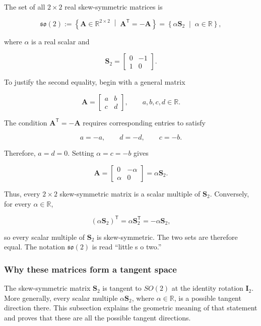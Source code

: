 \documentclass[
  australian,
  12pt,
  letterpaper,
  DIV=11,
  numbers=noendperiod,
  twoside]{scrreprt}
\begin{document}
The set of all \(2\times2\) real skew-symmetric matrices is

\[
\mathfrak{so}(2)
\mathrel{:=}
\left\{
\mathbf A\in\mathbb R^{2\times2}
\;\middle|\;
\mathbf A^\mathsf T=-\mathbf A
\right\}
=
\left\{
\alpha\mathbf S_2
\;\middle|\;
\alpha\in\mathbb R
\right\},
\]

where \(\alpha\) is a real scalar and

\[
\mathbf S_2
=
\begin{bmatrix}
0&-1\\
1&0
\end{bmatrix}.
\]

To justify the second equality, begin with a general matrix

\[
\mathbf A
=
\begin{bmatrix}
a&b\\
c&d
\end{bmatrix},
\qquad
a,b,c,d\in\mathbb R.
\]

The condition \(\mathbf A^\mathsf T=-\mathbf A\) requires corresponding
entries to satisfy

\[
a=-a,
\qquad
d=-d,
\qquad
c=-b.
\]

Therefore, \(a=d=0\). Setting \(\alpha=c=-b\) gives

\[
\mathbf A
=
\begin{bmatrix}
0&-\alpha\\
\alpha&0
\end{bmatrix}
=
\alpha\mathbf S_2.
\]

Thus, every \(2\times2\) skew-symmetric matrix is a scalar multiple of
\(\mathbf S_2\). Conversely, for every \(\alpha\in\mathbb R\),

\[
(\alpha\mathbf S_2)^\mathsf T
=
\alpha\mathbf S_2^\mathsf T
=
-\alpha\mathbf S_2,
\]

so every scalar multiple of \(\mathbf S_2\) is skew-symmetric. The two
sets are therefore equal. The notation \(\mathfrak{so}(2)\) is read
``little s o two.''

\subsubsection{Why these matrices form a tangent
space}\label{why-these-matrices-form-a-tangent-space}

The skew-symmetric matrix \(\mathbf S_2\) is tangent to \(SO(2)\) at the
identity rotation \(\mathbf I_2\). More generally, every scalar multiple
\(\alpha\mathbf S_2\), where \(\alpha\in\mathbb R\), is a possible
tangent direction there. This subsection explains the geometric meaning
of that statement and proves that these are all the possible tangent
directions.
\end{document}
